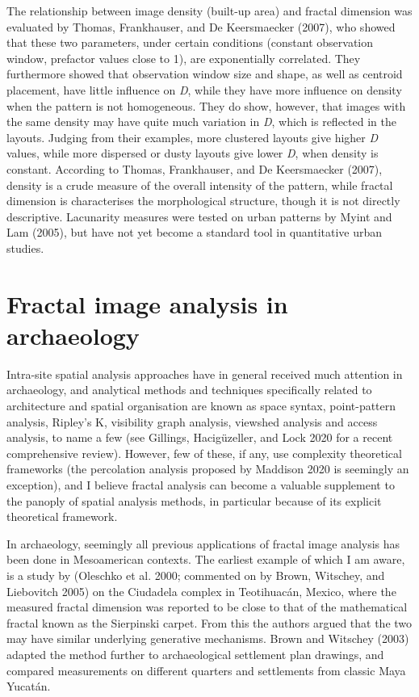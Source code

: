 \documentclass[
  12pt,
  a4paper, twoside]{book}
\begin{document}
The relationship between image density (built-up area) and fractal dimension was evaluated by Thomas, Frankhauser, and De Keersmaecker (2007), who showed that these two parameters, under certain conditions (constant observation window, prefactor values close to 1), are exponentially correlated. They furthermore showed that observation window size and shape, as well as centroid placement, have little influence on \emph{D}, while they have more influence on density when the pattern is not homogeneous. They do show, however, that images with the same density may have quite much variation in \emph{D}, which is reflected in the layouts. Judging from their examples, more clustered layouts give higher \emph{D} values, while more dispersed or dusty layouts give lower \emph{D}, when density is constant. According to Thomas, Frankhauser, and De Keersmaecker (2007), density is a crude measure of the overall intensity of the pattern, while fractal dimension is characterises the morphological structure, though it is not directly descriptive. Lacunarity measures were tested on urban patterns by Myint and Lam (2005), but have not yet become a standard tool in quantitative urban studies.

\hypertarget{image-archaeo}{%
\section{Fractal image analysis in archaeology}\label{image-archaeo}}

Intra-site spatial analysis approaches have in general received much attention in archaeology, and analytical methods and techniques specifically related to architecture and spatial organisation are known as space syntax, point-pattern analysis, Ripley's K, visibility graph analysis, viewshed analysis and access analysis, to name a few (see Gillings, Hacigüzeller, and Lock 2020 for a recent comprehensive review). However, few of these, if any, use complexity theoretical frameworks (the percolation analysis proposed by Maddison 2020 is seemingly an exception), and I believe fractal analysis can become a valuable supplement to the panoply of spatial analysis methods, in particular because of its explicit theoretical framework.

In archaeology, seemingly all previous applications of fractal image analysis has been done in Mesoamerican contexts. The earliest example of which I am aware, is a study by (Oleschko et al. 2000; commented on by Brown, Witschey, and Liebovitch 2005) on the Ciudadela complex in Teotihuacán, Mexico, where the measured fractal dimension was reported to be close to that of the mathematical fractal known as the Sierpinski carpet. From this the authors argued that the two may have similar underlying generative mechanisms. Brown and Witschey (2003) adapted the method further to archaeological settlement plan drawings, and compared measurements on different quarters and settlements from classic Maya Yucatán.
\end{document}
